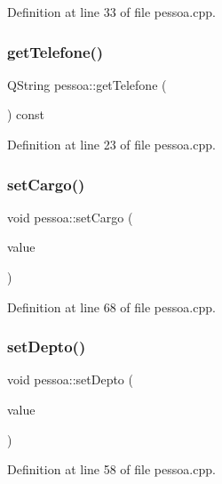 Definition at line 33 of file pessoa.\+cpp.

\hypertarget{classpessoa_a5e13bd9cf6187d2ceefd4faa9f43cb6c}{}\label{classpessoa_a5e13bd9cf6187d2ceefd4faa9f43cb6c} 
\subsubsection{\texorpdfstring{get\+Telefone()}{getTelefone()}}
{\footnotesize\ttfamily Q\+String pessoa\+::get\+Telefone (\begin{DoxyParamCaption}{ }\end{DoxyParamCaption}) const}



Definition at line 23 of file pessoa.\+cpp.

\hypertarget{classpessoa_a1a6ebf59740db53d42fbac357f6219b5}{}\label{classpessoa_a1a6ebf59740db53d42fbac357f6219b5} 
\subsubsection{\texorpdfstring{set\+Cargo()}{setCargo()}}
{\footnotesize\ttfamily void pessoa\+::set\+Cargo (\begin{DoxyParamCaption}\item[{const Q\+String \&}]{value }\end{DoxyParamCaption})}



Definition at line 68 of file pessoa.\+cpp.

\hypertarget{classpessoa_a4a32656512ade652bec82a5c749ad7d1}{}\label{classpessoa_a4a32656512ade652bec82a5c749ad7d1} 
\subsubsection{\texorpdfstring{set\+Depto()}{setDepto()}}
{\footnotesize\ttfamily void pessoa\+::set\+Depto (\begin{DoxyParamCaption}\item[{const Q\+String \&}]{value }\end{DoxyParamCaption})}



Definition at line 58 of file pessoa.\+cpp.

